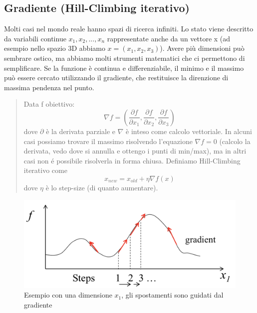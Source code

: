 \documentclass{article}
\begin{document}
\subsection{Gradiente (Hill-Climbing iterativo)}
Molti casi nel mondo reale hanno spazi di ricerca infiniti. Lo stato viene descritto da variabili continue $x_1, x_2, ..., x_n$ rappresentate anche da un vettore x (ad esempio nello spazio 3D abbiamo $x=(x_1,x_2,x_3)$). Avere più dimensioni può sembrare ostico, ma abbiamo molti strumenti matematici che ci permettono di semplificare. \newline
Se la funzione è continua e differenziabile, il minimo e il massimo può essere cercato utilizzando il gradiente, che restituisce la direnzione di massima pendenza nel punto.
\begin{quote}
    Data f obiettivo:
    \[
    \nabla f = (\frac{\partial f}{\partial x_1}, \frac{\partial f}{\partial x_2}, \frac{\partial f}{\partial x_3})
    \] \newline dove $\partial$ è la derivata parziale e $\nabla$ è inteso come calcolo vettoriale. In alcuni casi possiamo trovare il massimo risolvendo l'equazione $\nabla f=0$ (calcolo la derivata, vedo dove si annulla e ottengo i punti di min/max), ma in altri casi non é possibile risolverla in forma chiusa.\newline
    Definiamo Hill-Climbing iterativo come
    \[
        x_{new} = x_{old} + \eta \nabla f(x)
    \]
    dove $\eta$ è lo step-size (di quanto aumentare).
\end{quote}
\begin{figure}[H]
    \centering
    \includegraphics[scale=0.5]{Images/gradient.png}
    \caption{Esempio con una dimensione $x_1$, gli spostamenti sono guidati dal gradiente}
\end{figure}

\clearpage
\end{document}
